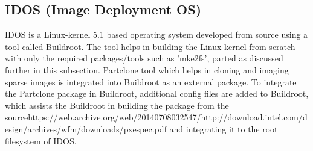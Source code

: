 \documentclass[a4paper,12pt]{article}
\begin{document}
\subsection{ IDOS (Image Deployment OS) }
IDOS is a Linux-kernel 5.1 based operating system developed from source using a tool called  Buildroot\cite{buildroot}. The tool helps in building the Linux kernel from scratch with only the required packages/tools such as 'mke2fs', parted as discussed further in this subsection. Partclone tool which helps in cloning and imaging sparse images is integrated into Buildroot as an external package. To integrate the Partclone package in Buildroot, additional config files are added to Buildroot, which assists the Buildroot in building the package from the sourcehttps://web.archive.org/web/20140708032547/http://download.intel.com/design/archives/wfm/downloads/pxespec.pdf and integrating it to the root filesystem of IDOS.
\end{document}

